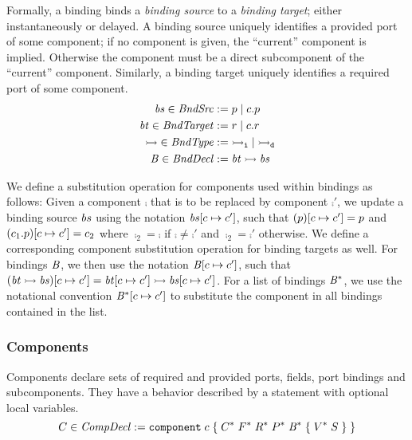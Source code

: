 \documentclass[a4paper,10pt,english]{article}
\begin{document}
Formally, a binding binds a \textit{binding source} to a \textit{binding target}; either instantaneously or delayed. A
binding source uniquely identifies a provided port of some component; if no component is given, the ``current'' component is
implied. Otherwise the component must be a direct subcomponent of the ``current'' component. Similarly, a binding target uniquely
identifies a required port of some component.
\begin{align*} 
	\mathit{bs} \in \mathit{BndSrc} &:=
		p \mid c\mathtt{.}p
	\\
	\mathit{bt} \in \mathit{BndTarget} &:=
		r \mid c\mathtt{.}r 
	\\
	\mathtt{\rightarrowtail} \in \mathit{BndType} &:=
		\mathtt{\mathtt{\rightarrowtail}_i} \mid \mathtt{\mathtt{\rightarrowtail}_d}
	\\
	\mathit{B} \in \mathit{BndDecl} &:=
		\mathit{bt} \; \mathtt{\rightarrowtail} \; \mathit{bs}
\end{align*}

We define a substitution operation for components used within bindings as follows: Given a component $\comp$ that is to be
replaced by component $\comp'$, we update a binding source $\mathit{bs}$ using the notation $\mathit{bs}[c
\mapsto c']$, such that $(p)[c \mapsto c'] = p$ and $(c_1\mathtt{.}p)[c
\mapsto c'] = c_2$ where $\comp_2 = \comp$ if $\comp \neq \comp'$ and $\comp_2 = \comp'$ otherwise. We define a
corresponding component substitution operation for binding targets as well. For bindings $\mathit{B}$, we then use the
notation $\mathit{B}[c \mapsto c']$, such that
$(\mathit{bt} \; \mathtt{\rightarrowtail} \; \mathit{bs})[c
\mapsto c'] = \mathit{bt}[c \mapsto c'] \; \mathtt{\rightarrowtail} \; \mathit{bs}[c \mapsto c']$.
For a list of bindings $\mathit{B}^*$, we use the notational convention
$\mathit{B}^*[c \mapsto c']$ to substitute the component in all bindings contained in the list.

\subsubsection{Components}
Components declare sets of required and provided ports, fields, port bindings and subcomponents. They have a behavior described by
a statement with optional local variables.
\begin{equation*}
	C \in \mathit{CompDecl} :=  
		\texttt{component} \; c \; \mathtt{\{} \; C^* \; F^* \; R^* \; P^* \; \mathit{B}^* \; \mathtt{\{} \; V^* \; S \; \mathtt{\}} \; \mathtt{\}}
\end{equation*}
\end{document}
